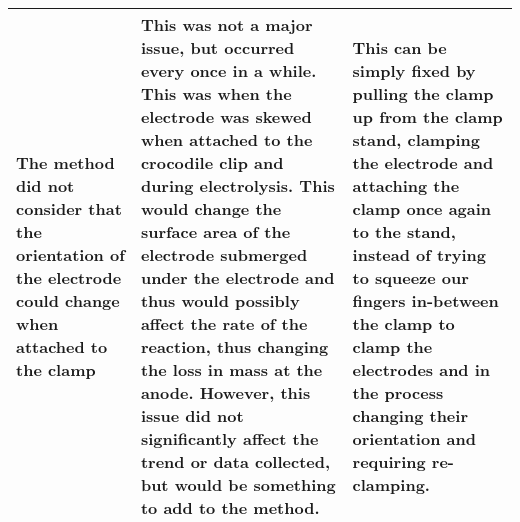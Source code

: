 \documentclass[11pt, a4]{article}
\begin{document}
\begin{small}
\begin{longtable}{|m{3.5cm}|m{7cm}|m{4.7cm}|}
					The method did not consider that the orientation of the electrode could change when attached to the clamp &
					This was not a major issue, but occurred every once in a while. This was when the electrode was skewed when attached to the crocodile clip and during electrolysis. This would change the surface area of the electrode submerged under the electrode and thus would possibly affect the rate of the reaction, thus changing the loss in mass at the anode. However, this issue did not significantly affect the trend or data collected, but would be something to add to the method. &
					This can be simply fixed by pulling the clamp up from the clamp stand, clamping the electrode and attaching the clamp once again to the stand, instead of trying to squeeze our fingers in-between the clamp to clamp the electrodes and in the process changing their orientation and requiring re-clamping.\\
					
					\hline
				\end{longtable}
			\end{small}
\end{document}
